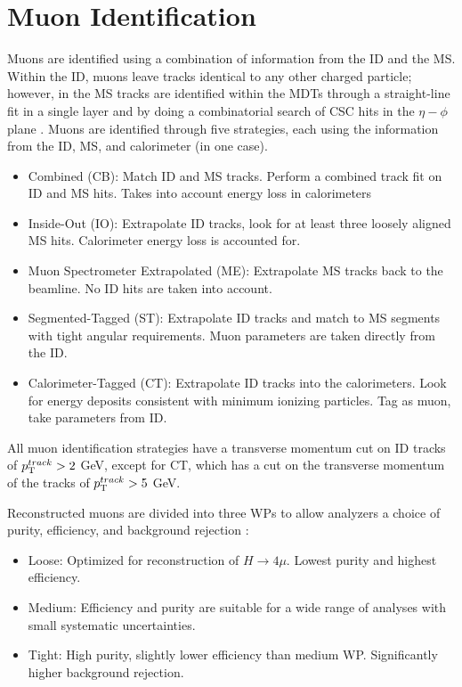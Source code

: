 		\section{Muon Identification}\label{sec:reco-muon}
		Muons are identified using a combination of information from the \gls{ID} and the \gls{MS}. Within the \gls{ID}, muons leave tracks identical to any other charged particle; however, in the \gls{MS} tracks are identified within the MDTs through a straight-line fit in a single layer and by doing a combinatorial search of CSC hits in the $\eta-\phi$ plane \cite{muon-id}. Muons are identified through five strategies, each using the information from the \gls{ID}, \gls{MS}, and calorimeter (in one case).
		\begin{itemize}
			\item Combined (\acrshort{CB}): Match \gls{ID} and \gls{MS} tracks. Perform a combined track fit on \gls{ID} and \gls{MS} hits. Takes into account energy loss in calorimeters
			\item Inside-Out (\acrshort{IO}): Extrapolate \gls{ID} tracks, look for at least three loosely aligned \gls{MS} hits. Calorimeter energy loss is accounted for.
			\item Muon Spectrometer Extrapolated (ME): Extrapolate \gls{MS} tracks back to the beamline. No \gls{ID} hits are taken into account.
			\item Segmented-Tagged (\acrshort{ST}): Extrapolate \gls{ID} tracks and match to \gls{MS} segments with tight angular requirements. Muon parameters are taken directly from the \gls{ID}.
			\item Calorimeter-Tagged (\acrshort{CT}): Extrapolate \gls{ID} tracks into the calorimeters. Look for energy deposits consistent with minimum ionizing particles. Tag as muon, take parameters from \gls{ID}.
		\end{itemize}
		All muon identification strategies have a transverse momentum cut on \gls{ID} tracks of $p_{\text{T}}^{track}> 2$ GeV, except for \acrshort{CT}, which has a cut on the transverse momentum of the tracks of $p_{\text{T}}^{track} > 5$ GeV.
		
		Reconstructed muons are divided into three \glspl{WP} to allow analyzers a choice of purity, efficiency, and background rejection \cite{muon-id}: 
		\begin{itemize}
			\item Loose: Optimized for reconstruction of $H\to 4\mu$. Lowest purity and highest efficiency.
			\item Medium: Efficiency and purity are suitable for a wide range of analyses with small systematic uncertainties.
			\item Tight: High purity, slightly lower efficiency than medium \gls{WP}. Significantly higher background rejection.
		\end{itemize}


